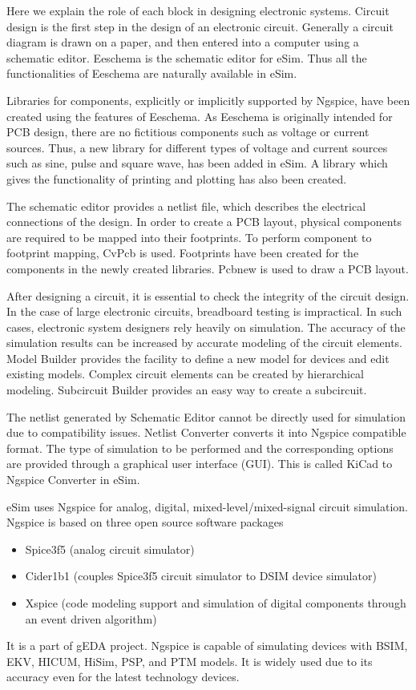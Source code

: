 %
Here we explain the role of each block in designing electronic
systems. Circuit design is the first step in the design of an electronic
circuit. Generally a circuit diagram is drawn on a paper, and then
entered into a computer using a schematic editor. Eeschema is the
schematic editor for eSim. Thus all the functionalities of Eeschema
are naturally available in eSim.  

Libraries for
components, explicitly or implicitly supported by Ngspice, have been
created using the features of Eeschema. As Eeschema is originally intended for PCB design, there are
no fictitious components such as voltage or current sources. Thus, a
new library for different types of voltage and current sources such as
sine, pulse and square wave, has been added in eSim. A library
which gives the functionality of printing and plotting has also been
created. 

The schematic editor provides a netlist file, which describes the
electrical connections of the  design. In order to create a PCB
layout, physical components are required to be mapped into their
footprints. To perform component to footprint mapping, CvPcb  is
used. Footprints have been created for the
components in the newly created libraries. Pcbnew is used to draw a
PCB layout. 

After designing a circuit, it is essential to check the integrity of
the circuit design. In the case of large electronic circuits,
breadboard testing is impractical. In such cases, electronic system
designers rely heavily on simulation. 
The accuracy of the simulation results can be increased by accurate
modeling of the circuit elements.
Model Builder provides the facility
to define a new model for devices and edit existing models. Complex
circuit elements can be created by hierarchical modeling. Subcircuit
Builder provides an easy way to create a subcircuit. 

The netlist generated by Schematic Editor cannot be directly used
for simulation due to compatibility issues. Netlist Converter converts
it into Ngspice compatible format. The type of simulation
to be performed and the corresponding options are
provided through a graphical user interface (GUI). This is called
KiCad to Ngspice Converter in eSim. 

eSim uses Ngspice for analog, digital, mixed-level/mixed-signal circuit
simulation. Ngspice is based on three open source software
packages%
\begin{itemize}
\item Spice3f5 (analog circuit simulator) 
\item Cider1b1 (couples Spice3f5 circuit simulator to DSIM device simulator)
\item Xspice (code modeling support and simulation of digital components through an event driven algorithm)
\end{itemize}
It is a part of gEDA  project. Ngspice is capable of
simulating devices with BSIM,  EKV,  HICUM, 
 HiSim,  PSP,  and PTM 
models. It is widely used due to its accuracy even for the latest
technology devices.

